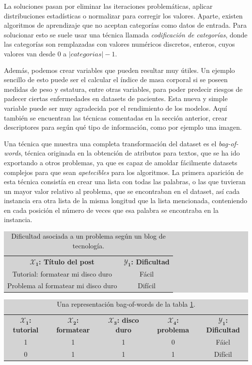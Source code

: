 La soluciones pasan por eliminar las iteraciones problemáticas, aplicar distribuciones estadísticas o normalizar para corregir los valores. Aparte, existen algoritmos de aprendizaje que no aceptan categorías como datos de entrada. Para solucionar esto se suele usar una técnica llamada \emph{codificación de categorías}, donde las categorías son remplazadas con valores numéricos discretos, enteros, cuyos valores van desde $0$ a $|categorias| - 1$.

Además, podemos crear variables que pueden resultar muy útiles. Un ejemplo sencillo de esto puede ser el calcular el índice de masa corporal si se poseen medidas de peso y estatura, entre otras variables, para poder predecir riesgos de padecer ciertas enfermedades en datasets de pacientes. Esta nueva y simple variable puede ser muy agradecida por el rendimiento de los modelos. Aquí también se encuentran las técnicas comentadas en la sección anterior, crear descriptores para según qué tipo de información, como por ejemplo una imagen.

Una técnica que muestra una completa transformación del dataset es el \emph{bag-of-words}, técnica originada en la obtención de atributos para textos, que se ha ido exportando a otros problemas, ya que es capaz de amoldar fácilmente datasets complejos para que sean \emph{apetecibles} para los algoritmos. La primera aparición de esta técnica consistía en crear una lista con todas las palabras, o las que tuvieran un mayor valor relativo al problema, que se encontraban en el dataset, así cada instancia era otra lista de la misma longitud que la lista mencionada, conteniendo en cada posición el número de veces que esa palabra se encontraba en la instancia. 

\begin{table}[ht]
\centering
\colorbox{lightgray}{\begin{tabular}{c | c} 
  $\mathbf{\mathcal{X}_{1}}$\textbf{: Título del post} & $\mathbf{\mathcal{Y}_{1}}$\textbf{: Dificultad} \\
  Tutorial: formatear mi disco duro & Fácil \\
  Problema al formatear mi disco duro & Difícil
\end{tabular}}
\caption{Dificultad asociada a un problema según un blog de tecnología.}
\label{table:2.2}
\end{table}

\begin{table}[ht]
\begin{adjustwidth}{-20mm}{-20mm}
\centering
\colorbox{lightgray}{\begin{tabular}{*{4}{c} | c} 
  $\mathbf{\mathcal{X}_{1}}$\textbf{: tutorial} & $\mathbf{\mathcal{X}_{2}}$\textbf{: formatear} & $\mathbf{\mathcal{X}_{3}}$\textbf{: disco duro} & $\mathbf{\mathcal{X}_{4}}$\textbf{: problema} & $\mathbf{\mathcal{Y}_{1}}$\textbf{: Dificultad} \\
  1 & 1 & 1 & 0 & Fáicl \\
  0 & 1 & 1 & 1 & Difícil
\end{tabular}}
\caption{Una representación bag-of-words de la tabla \ref{table:2.2}.}
\label{table:2.3}
\end{adjustwidth}
\end{table}

